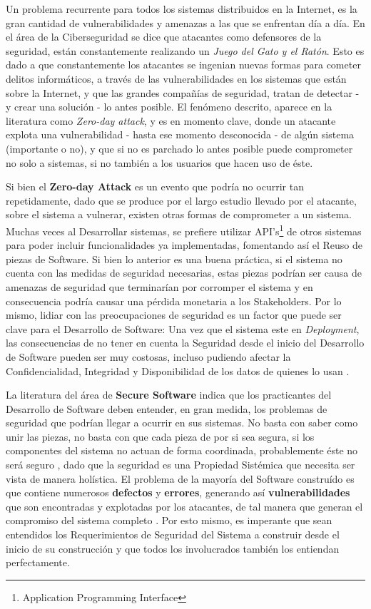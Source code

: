 Un problema recurrente para todos los sistemas distribuidos en la Internet, es la gran cantidad de vulnerabilidades y amenazas a las que se enfrentan día a día. En el área de la Ciberseguridad se dice que atacantes como defensores de la seguridad, están constantemente realizando un \textit{Juego del Gato y el Ratón}. Esto es dado a que constantemente los atacantes se ingenian nuevas formas para cometer delitos informáticos, a través de las vulnerabilidades en los sistemas que están sobre la Internet, y que las grandes compañías de seguridad, tratan de detectar - y crear una solución - lo antes posible. El fenómeno descrito, aparece en la literatura como \textit{Zero-day attack}, y es en momento clave, donde un atacante explota una vulnerabilidad - hasta ese momento desconocida - de algún sistema (importante o no), y que si no es parchado lo antes posible puede comprometer no solo a sistemas, si no también a los usuarios que hacen uso de éste.

Si bien el \textbf{Zero-day Attack} es un evento que podría no ocurrir tan repetidamente, dado que se produce por el largo estudio llevado por el atacante, sobre el sistema a vulnerar, existen otras formas de comprometer a un sistema. Muchas veces al Desarrollar sistemas, se prefiere utilizar API's\footnote{Application Programming Interface} de otros sistemas para poder incluir funcionalidades ya implementadas, fomentando así el Reuso de piezas de Software. Si bien lo anterior es una buena práctica, si el sistema no cuenta con las medidas de seguridad necesarias, estas piezas podrían ser causa de amenazas de seguridad que terminarían por corromper el sistema y en consecuencia podría causar una pérdida monetaria a los Stakeholders. Por lo mismo, lidiar con las preocupaciones de seguridad es un factor que puede ser clave para el Desarrollo de Software: Una vez que el sistema este en \textit{Deployment}, las consecuencias de no tener en cuenta la Seguridad desde el inicio del Desarrollo de Software pueden ser muy costosas, incluso pudiendo afectar la Confidencialidad, Integridad y Disponibilidad de los datos de quienes lo usan \cite{interCoursera}. %

La literatura del área de \textbf{Secure Software} indica que los practicantes del Desarrollo de Software deben entender, en gran medida, los problemas de seguridad que podrían llegar a ocurrir en sus sistemas. No basta con saber como unir las piezas, no basta con que cada pieza de por si sea segura, si los componentes del sistema no actuan de forma coordinada, probablemente éste no será seguro \cite{fernandez2013security}, dado que la seguridad es una Propiedad Sistémica que necesita ser vista de manera holística. El problema de la mayoría del Software construído es que contiene numerosos \textbf{defectos} y \textbf{errores}, generando así \textbf{vulnerabilidades} que son encontradas y explotadas por los atacantes, de tal manera que generan el compromiso del sistema completo \cite{goertzel2007software}. Por esto mismo, es imperante que sean entendidos los Requerimientos de Seguridad del Sistema a construir desde el inicio de su construcción y que todos los involucrados también los entiendan perfectamente. 

